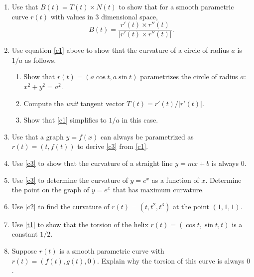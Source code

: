 \documentclass[12pt]{article}
\numberwithin{equation}{subsection}
\numberwithin{figure}{subsection}
\theoremstyle{note}
\begin{document}
{\begin{enumerate}[label=\arabic*.]
\begin{enumerate} 
	\item $r(t)=(t^2-1, t)$, $t=1$
	\item $r(t)=(t, t^2, t^3)$, $t=1$
	\item $r(t)=(e^t \cos t, e^t \sin t, e^t)$, $t=0$
\end{enumerate}

\item Use that $B(t)=T(t) \times N(t)$ to show that for a smooth parametric curve $r(t)$ with values in 3 dimensional space, \begin{equation} B(t)=\dfrac{ r'(t) \times r''(t)} {|r'(t) \times r''(t)|}.\end{equation}

\item Use equation \eqref{c1} above to show that the curvature of a circle of radius $a$ is $1/a$ as follows.
\begin{enumerate}
	\item Show that $r(t)=(a\cos t, a\sin t)$ parametrizes the circle of radius $a$: $x^2+y^2=a^2$.
	\item Compute the \textit{unit} tangent vector $T(t)=r'(t)/|r'(t)|$.
	\item Show that \eqref{c1} simplifies to $1/a$ in this case. 
\end{enumerate}

\item Use that a graph $y=f(x)$ can always be parametrized as $r(t)=(t,f(t))$ to derive \eqref{c3} from \eqref{c1}.
\item Use \eqref{c3} to show that the curvature of a straight line $y=mx+b$ is always $0$. 

\item Use \eqref{c3} to determine the curvature of $y=e^x$ as a function of $x$. Determine the point on the graph of $y=e^x$ that has maximum curvature.

\item Use \eqref{c2} to find the curvature of $r(t)=(t,t^2,t^3)$ at the point $(1,1,1)$. 


\item Use \eqref{t1} to show that the torsion of the helix $r(t)=(\cos t, \sin t, t)$ is a constant $1/2$. 

\item Suppose $r(t)$ is a smooth parametric curve with $r(t)=(f(t), g(t),0)$. Explain why the torsion of this curve is always $0$. 
\end{enumerate}

}
\end{document}
